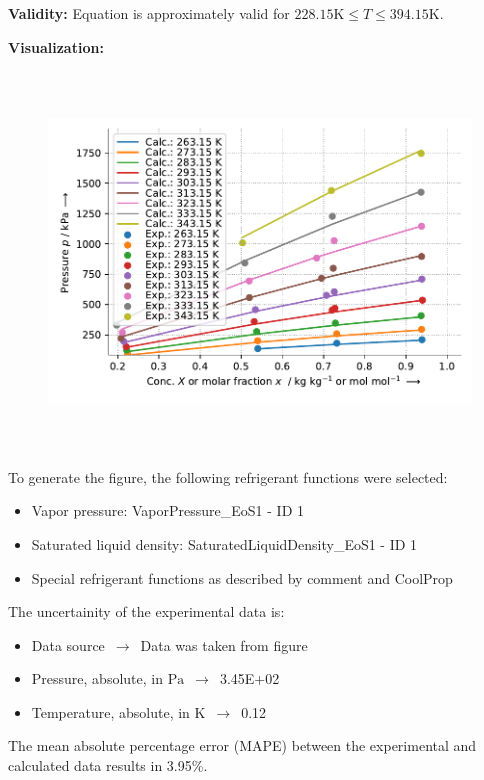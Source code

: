 \textbf{Validity:}
\newline
Equation is approximately valid for $228.15 \si{\kelvin} \leq T \leq 394.15 \si{\kelvin}$.
\newline

\textbf{Visualization:}
%
\begin{figure}[!htp]
{\noindent\includegraphics[height=10cm, keepaspectratio]{figs/abs/abs_R-12_naphthenic__WilsonFixedDl_1.pdf}}
\end{figure}
%

To generate the figure, the following refrigerant functions were selected:
\begin{itemize}
\item Vapor pressure: VaporPressure\_EoS1 - ID 1
\item Saturated liquid density: SaturatedLiquidDensity\_EoS1 - ID 1
\item Special refrigerant functions as described by comment and CoolProp
\end{itemize}

The uncertainity of the experimental data is:
\begin{itemize}
\item Data source $\,\to\,$ Data was taken from figure
\item Pressure, absolute, in $\si{\pascal}$ $\,\to\,$ 3.45E+02
\item Temperature, absolute, in $\si{\kelvin}$ $\,\to\,$ 0.12
\end{itemize}

The mean absolute percentage error (MAPE) between the experimental and calculated data results in 3.95\%.
\FloatBarrier
\newpage
